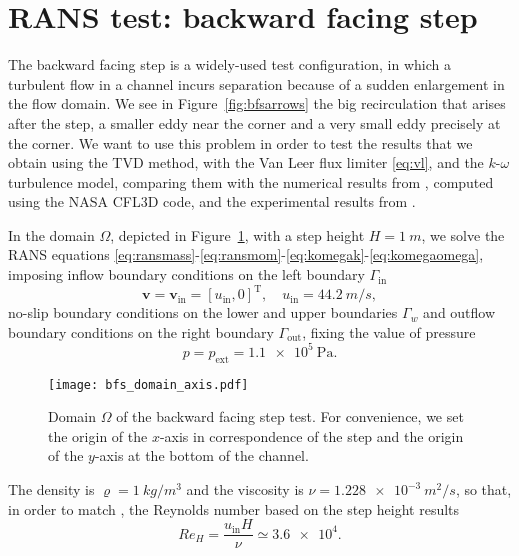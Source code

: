 \section{RANS test: backward facing step} \label{sec:bfs}
The backward facing step is a widely-used test configuration, in which a 
turbulent flow in a channel incurs separation because of a sudden enlargement 
in the flow domain. We see in Figure~\ref{fig:bfsarrows} the big recirculation that arises after the step, a smaller eddy near the corner and a very 
small 
eddy precisely at the corner. We want to use this problem in order to test the 
results that we obtain using the TVD method, with the Van Leer flux limiter 
\eqref{eq:vl}, and the $k\text{-}\omega$ turbulence model, comparing them with 
the numerical results from \cite{web:nasa}, computed using the NASA CFL3D code, 
and the experimental results from \cite{bfs:driver}.

In the domain $\Omega$, depicted in Figure~\ref{fig:bfsdomain}, with a step height $H=\SI{1}{m}$, we solve the RANS equations \eqref{eq:ransmass}-\eqref{eq:ransmom}-\eqref{eq:komegak}-\eqref{eq:komegaomega}, imposing inflow boundary conditions on the left boundary $\Gamma_\text{in}$
\begin{equation}
	\mathbf{v} = \mathbf{v}_\text{in} = [u_\text{in}, 0]^\mathrm{T}, \quad u_\text{in} = \SI{44.2}{m/s},
\end{equation} no-slip boundary conditions on the lower and upper boundaries $\Gamma_w$ and outflow boundary conditions on the right boundary $\Gamma_\text{out}$, fixing the value of pressure
\begin{equation}
	p = p_\text{ext} = \SI{1.1e5}{\pascal}.
\end{equation}
\begin{figure}
	\centering
	\texttt{[image: bfs\_domain\_axis.pdf]}
	\caption[Domain of the backward facing step test]{Domain $\Omega$ of the backward facing step test. For convenience, we set the origin of the $x$-axis in correspondence of the step and the origin of the $y$-axis at the bottom of the channel.}
	\label{fig:bfsdomain}
\end{figure}
The density is $\varrho = \SI{1}{kg/m^3}$ and the viscosity is $\nu=\SI{1.228e-3}{m^2/s}$, so that, in order to match \cite{web:nasa}, the Reynolds number based on the step height results
\begin{equation}
	Re_H = \frac{u_\text{in}H}{\nu} \simeq \num{3.6e4}.
\end{equation}

